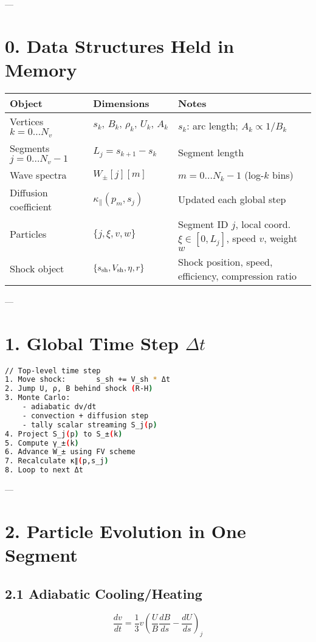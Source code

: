 ---

\section*{0. Data Structures Held in Memory}

\renewcommand{\arraystretch}{1.2}
\begin{tabular}{p{5cm} p{3.5cm} p{7cm}}
\toprule
\textbf{Object} & \textbf{Dimensions} & \textbf{Notes} \\
\midrule
Vertices $k=0\dots N_v$ & $s_k,\,B_k,\,\rho_k,\,U_k,\,A_k$ & $s_k$: arc length; $A_k \propto 1/B_k$ \\
Segments $j=0\dots N_v{-}1$ & $L_j = s_{k+1} - s_k$ & Segment length \\
Wave spectra & $W_{\pm}[j][m]$ & $m = 0\dots N_k{-}1$ (log-$k$ bins) \\
Diffusion coefficient & $\kappa_\parallel(p_m,s_j)$ & Updated each global step \\
Particles & $\{j, \xi, v, w\}$ & Segment ID $j$, local coord. $\xi \in [0,L_j]$, speed $v$, weight $w$ \\
Shock object & $\{s_{\rm sh}, V_{\rm sh}, \eta, r\}$ & Shock position, speed, efficiency, compression ratio \\
\bottomrule
\end{tabular}

---

\section*{1. Global Time Step $\Delta t$}

\begin{lstlisting}[language=bash,basicstyle=\ttfamily\small]
// Top-level time step
1. Move shock:       s_sh += V_sh * Δt
2. Jump U, ρ, B behind shock (R-H)
3. Monte Carlo:
    - adiabatic dv/dt
    - convection + diffusion step
    - tally scalar streaming S_j(p)
4. Project S_j(p) to S_±(k)
5. Compute γ_±(k)
6. Advance W_± using FV scheme
7. Recalculate κ∥(p,s_j)
8. Loop to next Δt
\end{lstlisting}

---

\section*{2. Particle Evolution in One Segment}

\subsection*{2.1 Adiabatic Cooling/Heating}
\begin{equation}
\frac{dv}{dt} = \frac{1}{3} v \left( \frac{U}{B} \frac{dB}{ds} - \frac{dU}{ds} \right)_{\!j}
\end{equation}

